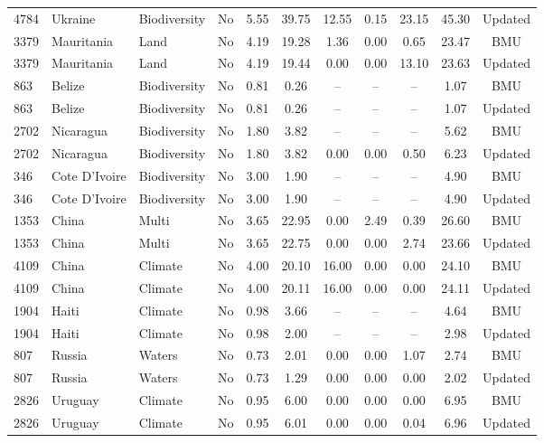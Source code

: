 \documentclass{article}
\begin{document}
\begin{singlespace}
\begin{table}[H]
{\begin{tabular}{lllcccccccc}
			\rowcolor[HTML]{EFEFEF} 
			4784 & Ukraine & Biodiversity & No & 5.55 & 39.75 & 12.55 & 0.15 & 23.15 & 45.30 & Updated \\
			3379 & Mauritania & Land & No & 4.19 & 19.28 & 1.36 & 0.00 & 0.65 & 23.47 & BMU \\
			\rowcolor[HTML]{EFEFEF} 
			3379 & Mauritania & Land & No & 4.19 & 19.44 & 0.00 & 0.00 & 13.10 & 23.63 & Updated \\
			863 & Belize & Biodiversity & No & 0.81 & 0.26 & -- & -- & -- & 1.07 & BMU \\
			\rowcolor[HTML]{EFEFEF} 
			863 & Belize & Biodiversity & No & 0.81 & 0.26 & -- & -- & -- & 1.07 & Updated \\
			2702 & Nicaragua & Biodiversity & No & 1.80 & 3.82 & -- & -- & -- & 5.62 & BMU \\
			\rowcolor[HTML]{EFEFEF} 
			2702 & Nicaragua & Biodiversity & No & 1.80 & 3.82 & 0.00 & 0.00 & 0.50 & 6.23 & Updated \\
			346 & Cote D'Ivoire & Biodiversity & No & 3.00 & 1.90 & -- & -- & -- & 4.90 & BMU \\
			\rowcolor[HTML]{EFEFEF} 
			346 & Cote D'Ivoire & Biodiversity & No & 3.00 & 1.90 & -- & -- & -- & 4.90 & Updated \\
			1353 & China & Multi & No & 3.65 & 22.95 & 0.00 & 2.49 & 0.39 & 26.60 & BMU \\
			\rowcolor[HTML]{EFEFEF} 
			1353 & China & Multi & No & 3.65 & 22.75 & 0.00 & 0.00 & 2.74 & 23.66 & Updated \\
			4109 & China & Climate & No & 4.00 & 20.10 & 16.00 & 0.00 & 0.00 & 24.10 & BMU \\
			\rowcolor[HTML]{EFEFEF} 
			4109 & China & Climate & No & 4.00 & 20.11 & 16.00 & 0.00 & 0.00 & 24.11 & Updated \\
			1904 & Haiti & Climate & No & 0.98 & 3.66 & -- & -- & -- & 4.64 & BMU \\
			\rowcolor[HTML]{EFEFEF} 
			1904 & Haiti & Climate & No & 0.98 & 2.00 & -- & -- & -- & 2.98 & Updated \\
			807 & Russia & Waters & No & 0.73 & 2.01 & 0.00 & 0.00 & 1.07 & 2.74 & BMU \\
			\rowcolor[HTML]{EFEFEF} 
			807 & Russia & Waters & No & 0.73 & 1.29 & 0.00 & 0.00 & 0.00 & 2.02 & Updated \\
			2826 & Uruguay & Climate & No & 0.95 & 6.00 & 0.00 & 0.00 & 0.00 & 6.95 & BMU \\
			\rowcolor[HTML]{EFEFEF} 
			2826 & Uruguay & Climate & No & 0.95 & 6.01 & 0.00 & 0.00 & 0.04 & 6.96 & Updated \\

\end{tabular}}
\end{table}
\end{singlespace}
\end{document}

